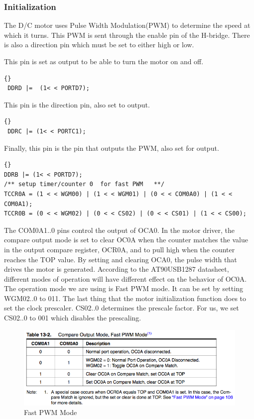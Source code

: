 \subsubsection{Initialization}
The D/C motor uses Pulse Width Modulation(PWM) to determine the speed at which it turns. This PWM is sent through the enable pin of the H-bridge. There is also a direction pin which must be set to either high or low.

This pin is set as output to be able to turn the motor on and off.
\lstset{language=c}
\lstset{commentstyle=\textit}
\begin{lstlisting}[frame=trbl]{}
 DDRD |=  (1< < PORTD7);
\end{lstlisting}

This pin is the direction pin, also set to output. 

\lstset{language=c}
\lstset{commentstyle=\textit}
\begin{lstlisting}[frame=trbl]{}
 DDRC |= (1< < PORTC1);
\end{lstlisting}

Finally, this pin is the pin that outputs the PWM, also set for output. 

\lstset{language=c}
\lstset{commentstyle=\textit}
\begin{lstlisting}[frame=trbl]{}
DDRB |= (1< < PORTD7);
/** setup timer/counter 0  for fast PWM   **/ 
TCCR0A = (1 < < WGM00) | (1 < < WGM01) | (0 < < COM0A0) | (1 < < COM0A1);
TCCR0B = (0 < < WGM02) | (0 < < CS02) | (0 < < CS01) | (1 < < CS00);
\end{lstlisting}

The COM0A1..0 pins control the output of OCA0. In the motor driver, the compare output mode is set to clear OC0A when the counter matches the value in the output compare register, OCR0A, and to pull high when the counter reaches the TOP value. By setting and clearing OCA0, the pulse width that drives the motor is generated. According to the AT90USB1287 datasheet, different modes of operation will have different effect on the behavior of OC0A. The operation mode we are using is Fast PWM mode. It can be set by setting WGM02..0 to 011. The last thing that the motor initialization function does to set the clock prescaler. CS02..0 determines the prescale factor. For us, we set CS02..0 to 001 which disables the prescaling.

\begin{figure}[tbp]
  \begin{center}
    \includegraphics[width=125mm]{imageSources/pwmTable1.png}
  \end{center}
  \caption{Fast PWM Mode} 
  \label{pwmTable1}
\end{figure}

